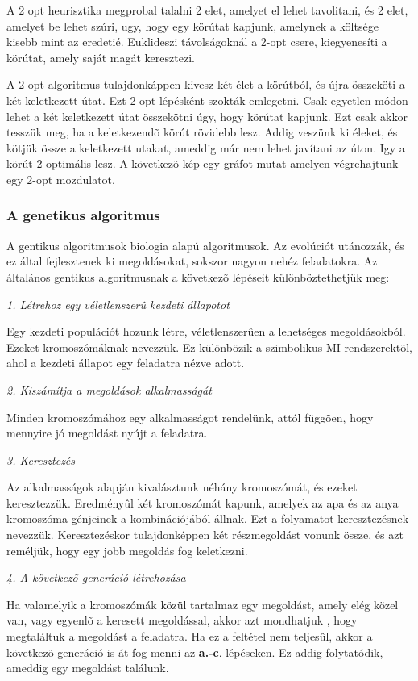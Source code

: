 A 2 opt heurisztika megprobal talalni 2 elet, amelyet el lehet tavolitani, 
és 2 elet, amelyet be lehet szúri, ugy, hogy egy körútat 
kapjunk, amelynek a költsége kisebb mint az eredetié. Euklideszi 
távolságoknál a 2-opt csere, kiegyenesíti a 
körútat, amely saját magát keresztezi.

A 2-opt algoritmus tulajdonkáppen kivesz két élet a 
körútból, és újra összeköti a két 
keletkezett útat. Ezt 2-opt lépésként szokták emlegetni. 
Csak egyetlen módon lehet a két keletkezett útat 
összekötni úgy, hogy körútat kapjunk. Ezt csak akkor 
tesszük meg, ha a keletkezendõ körút rövidebb lesz. Addig 
veszünk ki éleket, és kötjük össze a keletkezett 
utakat, ameddig már nem lehet javítani az úton. Igy a 
körút 2-optimális lesz. A következõ kép egy gráfot 
mutat amelyen végrehajtunk egy 2-opt mozdulatot.

\subsubsection{A genetikus algoritmus}

A gentikus algoritmusok biologia alapú algoritmusok. Az 
evolúciót utánozzák, és ez által fejlesztenek ki 
megoldásokat, sokszor nagyon nehéz feladatokra. Az általános 
gentikus algoritmusnak a következõ lépéseit 
különböztethetjük meg:

\emph{1. Létrehoz egy véletlenszerû kezdeti állapotot}

Egy kezdeti populációt hozunk létre, véletlenszerûen a 
lehetséges megoldásokból. Ezeket kromoszómáknak 
nevezzük. Ez különbözik a szimbolikus MI rendszerektõl, ahol 
a kezdeti állapot egy feladatra nézve adott.

\emph{2. Kiszámítja a megoldások alkalmasságát}

Minden kromoszómához egy alkalmasságot rendelünk, attól 
függõen, hogy mennyire jó megoldást nyújt a feladatra. 

\emph{3. Keresztezés}

Az alkalmasságok alapján kivalásztunk néhány 
kromoszómát, és ezeket keresztezzük. Eredményûl két 
kromoszómát kapunk, amelyek az apa és az anya kromoszóma 
génjeinek a kombinációjából állnak. Ezt a folyamatot 
keresztezésnek nevezzük. Keresztezéskor tulajdonképpen 
két részmegoldást vonunk össze, és azt reméljük, 
hogy egy jobb megoldás fog keletkezni.

\emph{4. A következõ generáció létrehozása}

Ha valamelyik a kromoszómák közül tartalmaz egy megoldást, 
amely elég közel van, vagy egyenlõ a keresett megoldással, akkor 
azt mondhatjuk , hogy megtaláltuk a megoldást a feladatra. Ha ez a 
feltétel nem teljesûl, akkor a következõ generáció is át 
fog menni az \textbf{a.-c}. lépéseken. Ez addig folytatódik, 
ameddig egy megoldást találunk.
